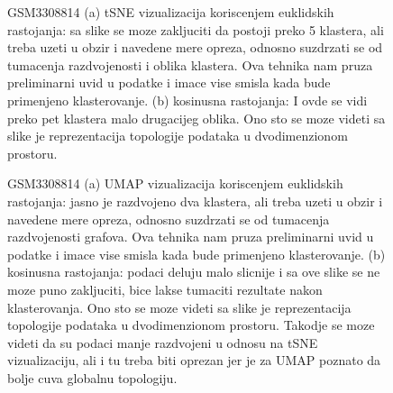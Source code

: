 \documentclass{article}
\begin{document}
\begin{figure}[!h]
    \centering
    \caption{ GSM3308814 (a) tSNE vizualizacija koriscenjem euklidskih rastojanja: sa slike se moze zakljuciti da postoji preko 5 klastera, ali treba uzeti u obzir i navedene mere opreza, odnosno suzdrzati se od tumacenja razdvojenosti i oblika klastera. Ova tehnika nam pruza preliminarni uvid u podatke i imace vise smisla kada bude primenjeno klasterovanje.  (b) kosinusna rastojanja: I ovde se vidi preko pet klastera malo drugacijeg oblika. Ono sto se moze videti sa slike je reprezentacija topologije podataka u dvodimenzionom prostoru. }
    \label{fig:visualize_14_tsne}
\end{figure}

\begin{figure}[!h]
    \centering
    \caption{ GSM3308814 (a) UMAP vizualizacija koriscenjem euklidskih rastojanja: jasno je razdvojeno dva klastera, ali treba uzeti u obzir i navedene mere opreza, odnosno suzdrzati se od tumacenja razdvojenosti grafova. Ova tehnika nam pruza preliminarni uvid u podatke i imace vise smisla kada bude primenjeno klasterovanje.  (b) kosinusna rastojanja: podaci deluju malo slicnije i sa ove slike se ne moze puno zakljuciti, bice lakse tumaciti rezultate nakon klasterovanja. Ono sto se moze videti sa slike je reprezentacija topologije podataka u dvodimenzionom prostoru. Takodje se moze videti da su podaci manje razdvojeni u odnosu na tSNE vizualizaciju, ali i tu treba biti oprezan jer je za UMAP poznato da bolje cuva globalnu topologiju. }
    \label{fig:visualize_14_umap}
\end{figure}
\end{document}
